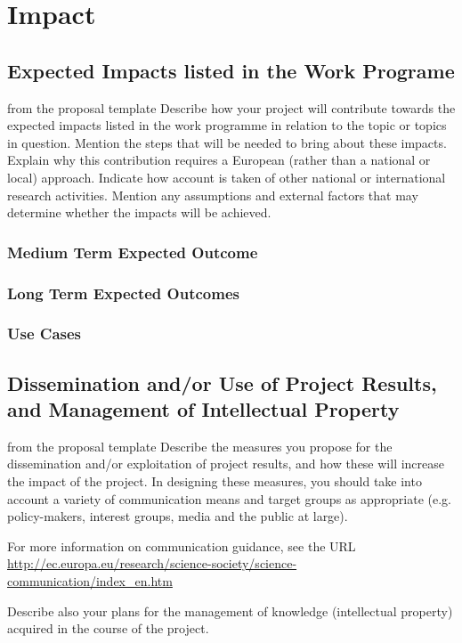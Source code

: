\chapter{Impact}\label{chap:impact}

\section{Expected Impacts listed in the Work Programe }\label{sec:expected-impact}
\begin{todo}{from the proposal template}
  Describe how your project will contribute towards the expected impacts listed in the
  work programme in relation to the topic or topics in question. Mention the steps that
  will be needed to bring about these impacts. Explain why this contribution requires a
  European (rather than a national or local) approach. Indicate how account is taken of
  other national or international research activities. Mention any assumptions and
  external factors that may determine whether the impacts will be achieved.
\end{todo}
\subsection{Medium Term Expected Outcome}

\subsection{Long Term Expected Outcomes}
\subsection{Use Cases}

\section{Dissemination and/or Use of Project Results, and Management of Intellectual Property}\label{sec:dissemination}

\begin{todo}{from the proposal template}
  Describe the measures you propose for the dissemination and/or exploitation of project
  results, and how these will increase the impact of the project. In designing these
  measures, you should take into account a variety of communication means and target
  groups as appropriate (e.g. policy-makers, interest groups, media and the public at
  large).

  For more information on communication guidance, see the URL
  \url{http://ec.europa.eu/research/science-society/science-communication/index_en.htm}

  Describe also your plans for the management of knowledge (intellectual property)
  acquired in the course of the project.
\end{todo}



